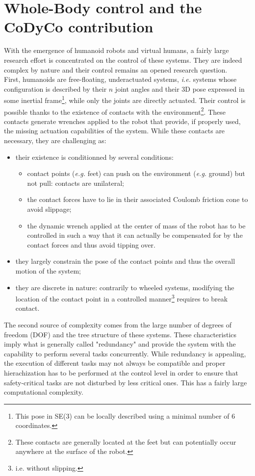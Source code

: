 \documentclass[12pt,a4paper,twoside]{article}
\begin{document}
\section{Whole-Body control and the CoDyCo contribution}

With the emergence of humanoid robots and virtual humans, a fairly large research effort is concentrated on the control of these systems. They are indeed complex by nature and their control remains an opened research question.\\

First, humanoids are free-floating, underactuated systems, \textit{i.e.} systems whose configuration is described by their $n$ joint angles and their 3D pose expressed in some inertial frame\footnote{This pose in SE(3) can be locally described using a minimal number of 6 coordinates.}, while only the joints are directly actuated. Their control is possible thanks to the existence of contacts with the environment\footnote{These contacts are generally located at the feet but can potentially occur anywhere at the surface of the robot.}. These contacts generate wrenches applied to the robot that provide, if properly used, the missing actuation capabilities of the system. While these contacts are necessary, they are challenging as:
\begin{itemize}
\item their existence is conditionned by several conditions: 
\begin{itemize}
\item contact points (\textit{e.g.} feet) can push on the environment (\textit{e.g.} ground) but not pull: contacts are unilateral;
\item the contact forces have to lie in their associated Coulomb friction cone to avoid slippage;
\item the dynamic wrench applied at the center of mass of the robot has to be controlled in such a way that it can actually be compensated for by the contact forces and thus avoid tipping over.
\end{itemize}
\item they largely constrain the pose of the contact points and thus the overall motion of the system;
\item they are discrete in nature: contrarily to wheeled systems, modifying the location of the contact point in a controlled manner\footnote{i.e. without slipping.} requires to break contact.
\end{itemize}

The second source of complexity comes from the large number of degrees of freedom (DOF) and the tree structure of these systems. These characteristics imply what is generally called "redundancy" and provide the system with the capability to perform several tasks concurrently. While redundancy is appealing, the execution of different tasks may not always be compatible and proper hierachization has to be performed at the control level in order to ensure that safety-critical tasks are not disturbed by less critical ones. This has a fairly large computational complexity.\\
\end{document}
